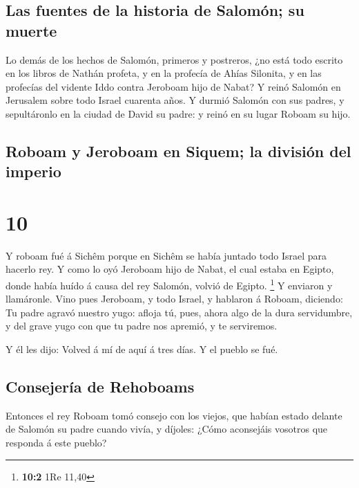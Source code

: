 \hypertarget{las-fuentes-de-la-historia-de-salomuxf3n-su-muerte}{%
\subsection{Las fuentes de la historia de Salomón; su
muerte}\label{las-fuentes-de-la-historia-de-salomuxf3n-su-muerte}}

 Lo demás de los hechos de Salomón, primeros y postreros,
¿no está todo escrito en los libros de Nathán profeta, y en la profecía
de Ahías Silonita, y en las profecías del vidente Iddo contra Jeroboam
hijo de Nabat?  Y reinó Salomón en Jerusalem sobre todo
Israel cuarenta años.  Y durmió Salomón con sus padres, y
sepultáronlo en la ciudad de David su padre: y reinó en su lugar Roboam
su hijo.

\hypertarget{roboam-y-jeroboam-en-siquem-la-divisiuxf3n-del-imperio}{%
\subsection{Roboam y Jeroboam en Siquem; la división del
imperio}\label{roboam-y-jeroboam-en-siquem-la-divisiuxf3n-del-imperio}}

\hypertarget{section-9}{%
\section{10}\label{section-9}}

 Y roboam fué á Sichêm porque en Sichêm se había juntado
todo Israel para hacerlo rey.  Y como lo oyó Jeroboam hijo
de Nabat, el cual estaba en Egipto, donde había huído á causa del rey
Salomón, volvió de Egipto. \footnote{\textbf{10:2} 1Re 11,40}
 Y enviaron y llamáronle. Vino pues Jeroboam, y todo Israel,
y hablaron á Roboam, diciendo:  Tu padre agravó nuestro
yugo: afloja tú, pues, ahora algo de la dura servidumbre, y del grave
yugo con que tu padre nos apremió, y te serviremos.

 Y él les dijo: Volved á mí de aquí á tres días. Y el pueblo
se fué.

\hypertarget{consejeruxeda-de-rehoboams}{%
\subsection{Consejería de Rehoboams}\label{consejeruxeda-de-rehoboams}}

 Entonces el rey Roboam tomó consejo con los viejos, que
habían estado delante de Salomón su padre cuando vivía, y díjoles: ¿Cómo
aconsejáis vosotros que responda á este pueblo?


